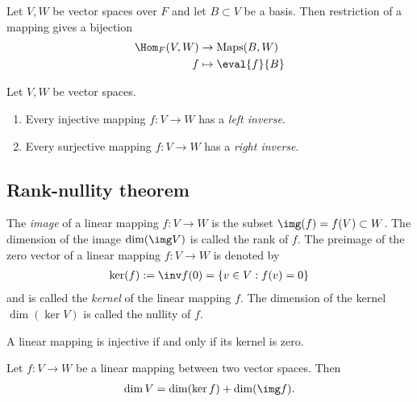 \documentclass{article}
\begin{document}
\begin{lemma}[Notes 1.7.8]
    Let $V,W$ be vector spaces over $F$ and let $B\subset V$ be a basis. Then
    restriction of a mapping gives a bijection
    \begin{align*}
        \Hom_F(V,W) & \to \text{Maps}(B,W) \\
        f           & \mapsto \eval{f}{B}
    \end{align*}
\end{lemma}

\begin{proposition}[Notes 1.7.9]
    Let $V,W$ be vector spaces.
    \begin{enumerate}
        \item Every injective mapping $f:V\to W$ has a \emph{left inverse}.
        \item Every surjective mapping $f:V\to W$ has a \emph{right inverse}.
    \end{enumerate}
\end{proposition}

\subsection{Rank-nullity theorem}

\begin{definition}
    The \emph{image} of a linear mapping $f:V\to W$ is the subset $\img(f)=f(V)\subset W$.
    The dimension of the image $\dim(\img V)$ is called the rank of $f$.
    The preimage of the zero vector of a linear mapping $f:V\to W$ is denoted by
    \begin{align*}
        \ker(f):=\inv f(0)=\{v\in V : f(v)=0\}
    \end{align*}
    and is called the \emph{kernel} of the linear mapping $f$. The dimension of the
    kernel $\dim(\ker V)$ is called the nullity of $f$.
\end{definition}

\begin{lemma}[Notes 1.8.2]
    A linear mapping is injective if and only if its kernel is zero.
\end{lemma}

\begin{theorem}
    Let $f:V\to W$ be a linear mapping between two vector spaces. Then
    \begin{align*}
        \dim V = \dim(\ker f) + \dim(\img f).
    \end{align*}
\end{theorem}
\end{document}
